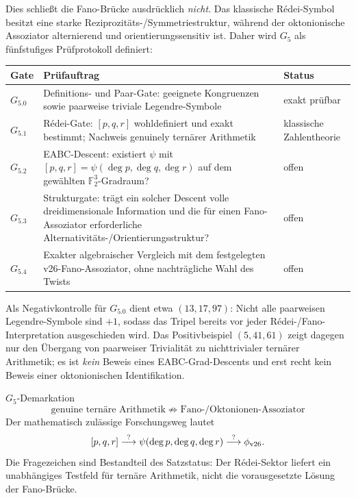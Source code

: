 \documentclass[11pt,a4paper]{article}
\begin{document}
Dies schließt die Fano-Brücke ausdrücklich \emph{nicht}. Das klassische Rédei-Symbol besitzt eine starke Reziprozitäts-/Symmetriestruktur, während der oktonionische Assoziator alternierend und orientierungssensitiv ist. Daher wird $G_5$ als fünfstufiges Prüfprotokoll definiert:

\begin{center}
\begin{tabularx}{\textwidth}{>{\bfseries}l X l}
\toprule
Gate & Prüfauftrag & Status\\
\midrule
$G_{5.0}$ & Definitions- und Paar-Gate: geeignete Kongruenzen sowie paarweise triviale Legendre-Symbole & exakt prüfbar\\
$G_{5.1}$ & Rédei-Gate: $[p,q,r]$ wohldefiniert und exakt bestimmt; Nachweis genuinely ternärer Arithmetik & klassische Zahlentheorie\\
$G_{5.2}$ & EABC-Descent: existiert $\psi$ mit $[p,q,r]=\psi(\deg p,\deg q,\deg r)$ auf dem gewählten $\mathbb F_2^3$-Gradraum? & offen\\
$G_{5.3}$ & Strukturgate: trägt ein solcher Descent volle dreidimensionale Information und die für einen Fano-Assoziator erforderliche Alternativitäts-/Orientierungsstruktur? & offen\\
$G_{5.4}$ & Exakter algebraischer Vergleich mit dem festgelegten v26-Fano-Assoziator, ohne nachträgliche Wahl des Twists & offen\\
\bottomrule
\end{tabularx}
\end{center}

Als Negativkontrolle für $G_{5.0}$ dient etwa $(13,17,97)$: Nicht alle paarweisen Legendre-Symbole sind $+1$, sodass das Tripel bereits vor jeder Rédei-/Fano-Interpretation ausgeschieden wird. Das Positivbeispiel $(5,41,61)$ zeigt dagegen nur den Übergang von paarweiser Trivialität zu nichttrivialer ternärer Arithmetik; es ist \emph{kein} Beweis eines EABC-Grad-Descents und erst recht kein Beweis einer oktonionischen Identifikation.

\begin{statusbox}{$G_5$-Demarkation}
\[
\boxed{
\text{genuine ternäre Arithmetik}
\;\not\Rightarrow\;
\text{Fano-/Oktonionen-Assoziator}
}
\]
Der mathematisch zulässige Forschungsweg lautet
\[
[p,q,r]
\stackrel{?}{\longrightarrow}
\psi(\deg p,\deg q,\deg r)
\stackrel{?}{\longrightarrow}
\phi_{\rm v26}.
\]
Die Fragezeichen sind Bestandteil des Satzstatus: Der Rédei-Sektor liefert ein unabhängiges Testfeld für ternäre Arithmetik, nicht die vorausgesetzte Lösung der Fano-Brücke.
\end{statusbox}
\end{document}
